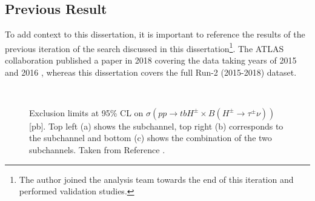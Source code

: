 	\subsection{Previous Result}\label{ssec:Prev Hpm}
		To add context to this dissertation, it is important to reference the results of the previous iteration of the search discussed in this dissertation\footnote{The author joined the analysis team towards the end of this iteration and performed validation studies.}. The \gls{ATLAS} collaboration published a paper in 2018 covering the data taking years of 2015 and 2016 \cite{hpm-previous}, whereas this dissertation covers the full Run-2 (2015-2018) dataset. 
		\begin{figure}[!ht]
			\centering
			 \\
			\caption{\label{fig:hpm-prev-limits} Exclusion limits at 95\% CL on $\sigma(pp \to tbH^{\pm} \times B(H^{\pm} \to \tau^\pm \nu)) $ [pb]. Top left (a) shows the \taujets subchannel, top right (b) corresponds to the \taulep subchannel and bottom (c) shows the combination of the two subchannels. Taken from Reference \cite{hpm-previous}. }
		\end{figure}
